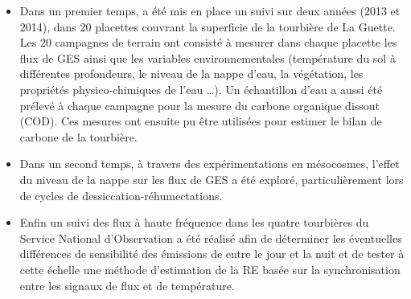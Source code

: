 \begin{itemize}
\item Dans un premier temps, a été mis en place un suivi sur deux années (2013 et 2014), dans 20 placettes couvrant la superficie de la tourbière de La Guette. 
Les 20 campagnes de terrain ont consisté à mesurer dans chaque placette les flux de GES ainsi que les variables environnementales (température du sol à différentes profondeurs, le niveau de la nappe d'eau, la végétation, les propriétés physico-chimiques de l'eau \dots).
Un échantillon d'eau a aussi été prélevé à chaque campagne pour la mesure du carbone organique dissout (COD).
Ces mesures ont ensuite pu être utilisées pour estimer le bilan de carbone de la tourbière.
\item Dans un second temps, à travers des expérimentations en mésocosmes, l'effet du niveau de la nappe sur les flux de GES a été exploré, particulièrement lors de cycles de dessiccation-réhumectations.
\item Enfin un suivi des flux à haute fréquence dans les quatre tourbières du Service National d'Observation a été réalisé afin de déterminer les éventuelles différences de sensibilité des émissions de \coo entre le jour et la nuit et de tester à cette échelle une méthode d'estimation de la RE basée sur la synchronisation entre les signaux de flux et de température.
\end{itemize}






